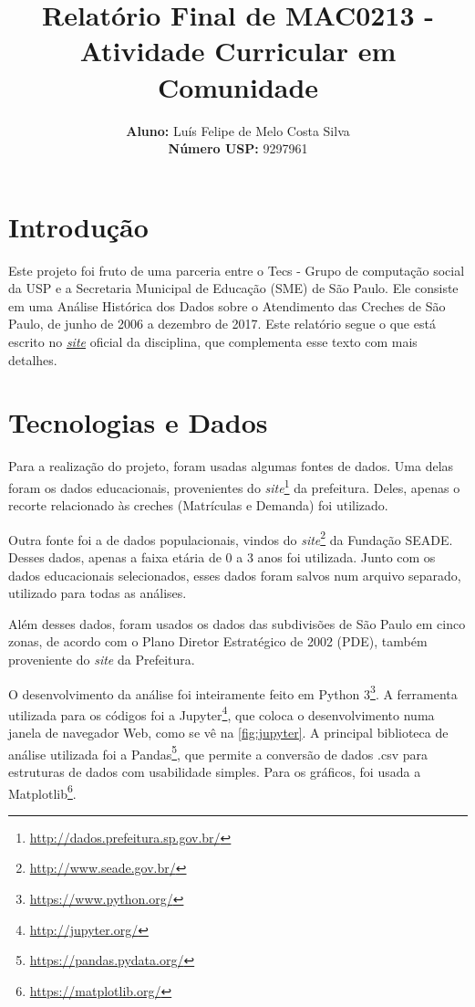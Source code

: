 \documentclass[12pt, a4paper]{article}
\title{\textbf{Relatório Final de MAC0213 - Atividade Curricular em Comunidade}}
\author{
    \textbf{Aluno:} Luís Felipe de Melo Costa Silva \\
    \textbf{Número USP:} 9297961
    }
\date{}
\begin{document}
\maketitle

\section*{Introdução}

Este projeto foi fruto de uma parceria entre o Tecs - Grupo de computação social da USP e a Secretaria Municipal de Educação (SME) de São Paulo. Ele consiste em uma Análise Histórica dos Dados sobre o Atendimento das Creches de São Paulo, de junho de 2006 a dezembro de 2017. Este relatório segue o que está escrito no \href{https://lsflp.github.io/MAC0213/}{\textit{site}} oficial da disciplina, que complementa esse texto com mais detalhes.

\section{Tecnologias e Dados}

Para a realização do projeto, foram usadas algumas fontes de dados. Uma delas foram os dados educacionais, provenientes do \textit{site}\footnote{\url{http://dados.prefeitura.sp.gov.br/}} da prefeitura. Deles, apenas o recorte relacionado às creches (Matrículas e Demanda) foi utilizado.

Outra fonte foi a de dados populacionais, vindos do \textit{site}\footnote{\url{http://www.seade.gov.br/}} da Fundação SEADE. Desses dados, apenas a faixa etária de 0 a 3 anos foi utilizada. Junto com os dados educacionais selecionados, esses dados foram salvos num arquivo separado, utilizado para todas as análises.

Além desses dados, foram usados os dados das subdivisões de São Paulo em cinco zonas, de acordo com o Plano Diretor Estratégico de 2002 (PDE), também proveniente do \textit{site} da Prefeitura.

O desenvolvimento da análise foi inteiramente feito em Python 3\footnote{\url{https://www.python.org/}}. A ferramenta utilizada para os códigos foi a Jupyter\footnote{\url{http://jupyter.org/}}, que coloca o desenvolvimento numa janela de navegador Web, como se vê na \autoref{fig:jupyter}. A principal biblioteca de análise utilizada foi a Pandas\footnote{\url{https://pandas.pydata.org/}}, que permite a conversão de dados .csv para estruturas de dados com usabilidade simples. Para os gráficos, foi usada a Matplotlib\footnote{\url{https://matplotlib.org/}}.
\end{document}
